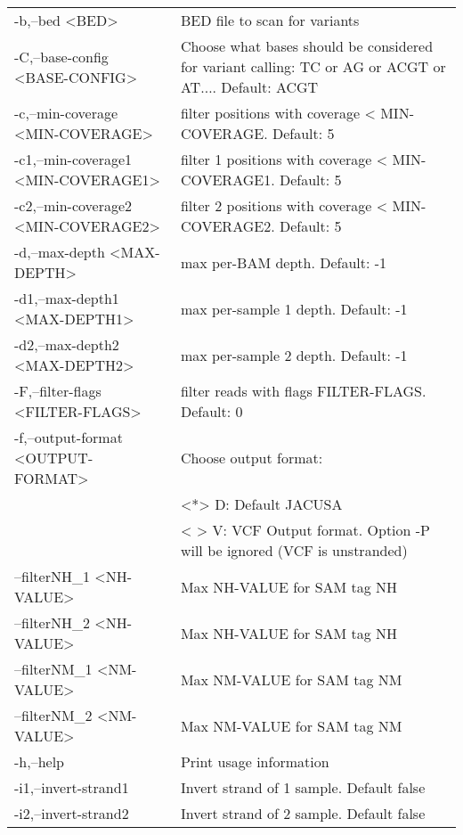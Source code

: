 \documentclass[10pt, a4paper]{article}
\begin{document}
\begin{center}
{\begin{longtable}{p{}p{}}
 -b,--bed <BED>									                & BED file to scan for variants \\
 -C,--base-config <BASE-CONFIG> 				        & Choose what bases should be considered for variant calling: TC or AG or ACGT or AT$\ldots$. Default: ACGT \\
 -c,--min-coverage <MIN-COVERAGE>               & filter positions with coverage < MIN-COVERAGE. Default: 5 \\
 -c1,--min-coverage1 <MIN-COVERAGE1>            & filter 1 positions with coverage < MIN-COVERAGE1. Default: 5 \\
 -c2,--min-coverage2 <MIN-COVERAGE2>            & filter 2 positions with coverage < MIN-COVERAGE2. Default: 5 \\
 -d,--max-depth <MAX-DEPTH>                     & max per-BAM depth. Default: -1 \\
 -d1,--max-depth1 <MAX-DEPTH1>                  & max per-sample 1 depth. Default: -1 \\
 -d2,--max-depth2 <MAX-DEPTH2>                  & max per-sample 2 depth. Default: -1 \\
 -F,--filter-flags <FILTER-FLAGS>               & filter reads with flags FILTER-FLAGS. Default: 0 \\
 -f,--output-format <OUTPUT-FORMAT>             & Choose output format: \\
                                                & <*> D: Default JACUSA \\
                                                & < > V: VCF Output format. Option -P will be ignored (VCF is unstranded) \\
    --filterNH\_1 <NH-VALUE>                    & Max NH-VALUE for SAM tag NH \\
    --filterNH\_2 <NH-VALUE>                    & Max NH-VALUE for SAM tag NH \\
    --filterNM\_1 <NM-VALUE>                    & Max NM-VALUE for SAM tag NM \\
    --filterNM\_2 <NM-VALUE>                    & Max NM-VALUE for SAM tag NM \\
 -h,--help                                      & Print usage information \\
 -i1,--invert-strand1                           & Invert strand of 1 sample. Default false \\
 -i2,--invert-strand2                           & Invert strand of 2 sample. Default false \\

\end{longtable}}
\end{center}
\end{document}
